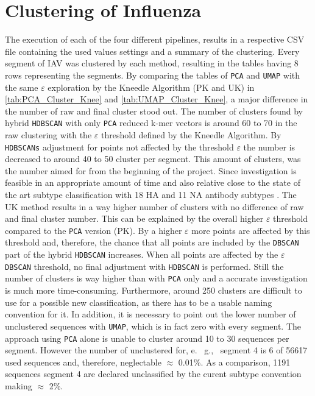 \section{Clustering of Influenza} \label{sec:Clustering}

The execution of each of the four different pipelines, results in a respective CSV file containing the used values settings and a summary of the clustering. Every segment of \gls{IAV} was clustered by each method, resulting in the tables having 8 rows representing the segments. By comparing the tables of \texttt{PCA} and \texttt{UMAP} with the same $\varepsilon$ exploration by the Kneedle Algorithm (PK and UK) in \autoref{tab:PCA_Cluster_Knee} and \autoref{tab:UMAP_Cluster_Knee}, a major difference in the number of raw and final cluster stood out. The number of clusters found by hybrid \texttt{HDBSCAN} with only \texttt{PCA} reduced k-mer vectors is around 60 to 70 in the raw clustering with the $\varepsilon$ threshold defined by the Kneedle Algorithm. By \texttt{HDBSCANs} adjustment for points not affected by the threshold $\varepsilon$ the number is decreased to around 40 to 50 cluster per segment. This amount of clusters, was the number aimed for from the beginning of the project. Since investigation is feasible in an appropriate amount of time and also relative close to the state of the art subtype classification with 18 \gls{HA} and 11 \gls{NA} antibody subtypes \autocite{noauthor_revision_1980}. The UK method results in a way higher number of clusters with no difference of raw and final cluster number. This can be explained by the overall higher $\varepsilon$ threshold compared to the \texttt{PCA} version (PK). By a higher $\varepsilon$ more points are affected by this threshold and, therefore, the chance that all points are included by the \texttt{DBSCAN} part of the hybrid \texttt{HDBSCAN} increases. When all points are affected by the $\varepsilon$ \texttt{DBSCAN} threshold, no final adjustment with \texttt{HDBSCAN} is performed. Still the number of clusters is way higher than with \texttt{PCA} only and a accurate investigation is much more time-consuming. Furthermore, around 250 clusters are difficult to use for a possible new classification, as there has to be a usable naming convention for it. In addition, it is necessary to point out the lower number of unclustered sequences with \texttt{UMAP}, which is in fact zero with every segment. The approach using \texttt{PCA} alone is unable to cluster around 10 to 30 sequences per segment. However the number of unclustered for, e.~ g.,~ segment 4 is 6 of 56617 used sequences and, therefore, neglectable $\approx$ 0.01\%. As a comparison, 1191 sequences segment 4 are declared unclassified by the curent subtype convention making $\approx$ 2\%. 

